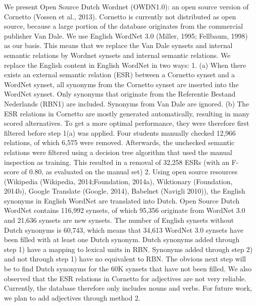 \documentclass[10pt, a4paper, twopage, headinclude, footinclude, BCOR5mm]{book}
\begin{document}
\begin{table}[t!]
\end{table} 
\noindent
We present Open Source Dutch Wordnet (OWDN1.0): an open source version of Cornetto (Vossen et al., 2013). Cornetto is currently not distributed as open source, because a large portion of the database originates from the commercial publisher Van Dale.  We use English WordNet 3.0 (Miller, 1995; Fellbaum, 1998) as our basis. This means that we replace the Van Dale synsets and internal semantic relations by Wordnet synsets and internal semantic relations.  We replace the English content in English WordNet in two ways: 1. (a)  When there exists an external semantic relation (ESR) between a Cornetto synset and a WordNet synset, all synonyms from the Cornetto synset are inserted into the WordNet synset. Only synonyms that originate from the Referentie Bestand Nederlands (RBN1) are included. Synonyms from Van Dale are ignored.  (b) The ESR relations in Cornetto are mostly generated automatically, resulting in many scored alternatives. To get a more optimal performance, they were therefore first filtered before step 1(a) was applied. Four students manually checked 12,966 relations, of which 6,575 were removed. Afterwards, the unchecked semantic relations were filtered using a decision tree algorithm that used the manual inspection as training. This resulted in a removal of 32,258 ESRs (with an F-score of 0.80, as evaluated on the manual set) 2. Using open source resources (Wikipedia (Wikipedia, 2014;Foundation, 2014a), Wiktionary (Foundation, 2014b), Google Translate (Google, 2014), Babelnet (Navigli 2010)), the English synonyms in English WordNet are translated into Dutch.  Open Source Dutch WordNet contains 116,992 synsets, of which 95,356 originate from WordNet 3.0 and 21,636 synsets are new synsets. The number of English synsets without Dutch synonyms is 60,743, which means that 34,613 WordNet 3.0 synsets have been filled with at least one Dutch synonym. Dutch synonyms added through step 1) have a mapping to lexical units in RBN. Synonyms added through step 2) and not through step 1) have no equivalent to RBN. 	The obvious next step will be to find Dutch synonyms for the 60K synsets that have not been filled. We also observed that the ESR relations in Cornetto for adjectives are not very reliable. Currently, the database therefore only includes nouns and verbs. For future work, we plan to add adjectives through method 2.  
\end{document}
